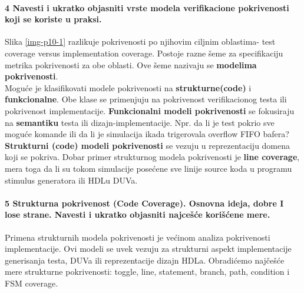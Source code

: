\documentclass[a4paper, 12pt]{article}
\begin{document}
\paragraph{4 Navesti i ukratko objasniti vrste modela verifikacione pokrivenosti koji se koriste u praksi.}
\hfill \break
\indent Slika \ref{img-p10-1} razlikuje pokrivenosti po njihovim ciljnim oblastima- test coverage versus implementation coverage. Postoje razne šeme za specifikaciju metrika pokrivenosti za obe oblasti. Ove šeme nazivaju se \textbf{modelima pokrivenosti}.\\
\indent Moguće je klasifikovati modele pokrivenosti na \textbf{strukturne(code)} i \textbf{funkcionalne}. Obe klase se primenjuju na pokrivenost verifikacionog testa ili pokrivenost implementacije. \textbf{Funkcionalni modeli pokrivenosti} se fokusiraju na \textbf{semantiku} testa ili dizajn-implementacije. Npr. da li je test pokrio sve moguće komande ili da li je simulacija ikada trigerovala overflow FIFO bafera? \textbf{Strukturni (code) modeli pokrivenosti} se vezuju u reprezentaciju domena koji se pokriva. Dobar primer strukturnog modela pokrivenosti je \textbf{line coverage}, mera toga da li su tokom simulacije posećene sve linije source koda u programu stimulus generatora ili HDLu DUVa.
\paragraph{5 Strukturna pokrivenost (Code Coverage). Osnovna ideja, dobre I lose strane. Navesti i ukratko objasniti najcešće korišćene mere.}
\hfill \break
\indent Primena strukturnih modela pokrivenosti je većinom analiza pokrivenosti implementacije. Ovi modeli se uvek vezuju za strukturni aspekt implementacije generisanja testa, DUVa ili reprezentacije dizajn HDLa. Obradićemo najčešće mere strukturne pokrivenosti: toggle, line, statement, branch, path, condition i FSM coverage.
\end{document}

